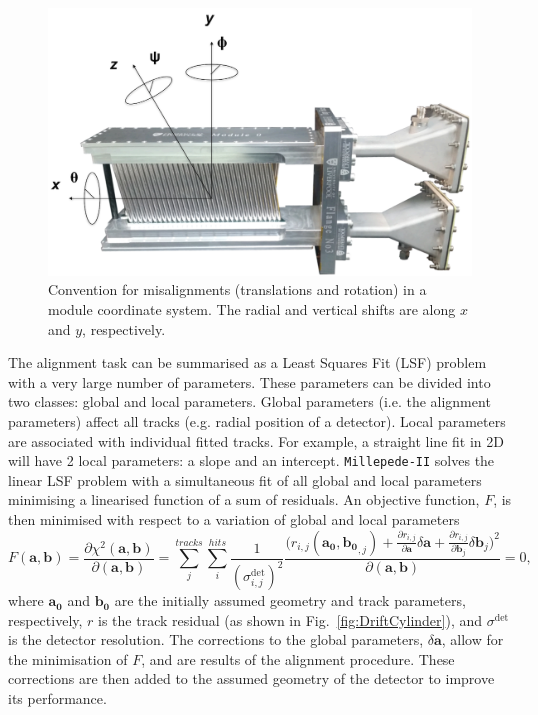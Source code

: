 \documentclass[12pt]{article}
\begin{document}
\begin{figure}[h!]
\centering
\includegraphics[width=0.6\linewidth]{fig/rotAxis.png}
\caption{Convention for misalignments (translations and rotation) in a module coordinate system. The radial and vertical shifts are along $x$ and $y$, respectively.}
\label{fig:Rotation}
\end{figure}

The alignment task can be summarised as a Least Squares Fit (LSF) problem with a very large number of parameters. These parameters can be divided into two classes: global and local parameters. Global parameters (i.e. the alignment parameters) affect all tracks (e.g. radial position of a detector). Local parameters are associated with individual fitted tracks. For example, a straight line fit in 2D will have 2 local parameters: a slope and an intercept. \texttt{Millepede-II} solves the linear LSF problem with a simultaneous fit of all global and local parameters minimising a linearised function of a sum of residuals. An objective function, $F$, is then minimised with respect to a variation of global and local parameters
\begin{equation}
\label{eq:obj_fun}
F(\boldsymbol{a},\boldsymbol{b})=\frac{\partial\chi^2(\boldsymbol{a},\boldsymbol{b})}{\partial(\boldsymbol{a},\boldsymbol{b})}=
\sum_{j}^{tracks}\sum_{i}^{hits} \frac{1}{(\sigma^{\mathrm{det}}_{i,j})^2} \frac{\big(r_{i,j}(\boldsymbol{a_0},\boldsymbol{b_0}_{,j})+\frac{\partial r_{i,j}}{\partial \boldsymbol{a}}
\delta \boldsymbol{a} +\frac{\partial r_{i,j}}{\partial \boldsymbol{b}_j}\delta \boldsymbol{b}_j\big)^2}{\partial(\boldsymbol{a},\boldsymbol{b})}=0,
\end{equation}
where $\boldsymbol{a_0}$ and $\boldsymbol{b_0}$ are the initially assumed geometry and track parameters, respectively, $r$ is the track residual (as shown in Fig.~\ref{fig:DriftCylinder}), and $\sigma^{\mathrm{det}}$ is the detector resolution. The corrections to the global parameters, $\delta\boldsymbol{a}$, allow for the minimisation of $F$, and are results of the alignment procedure. These corrections are then added to the assumed geometry of the detector to improve its performance.
\end{document}
